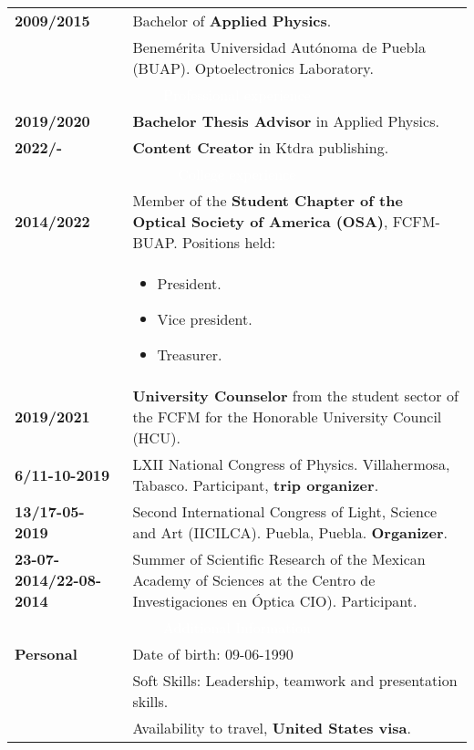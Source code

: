 \documentclass[twoside,letter,openright,10pt]{report}
\begin{document}
\begin{table}[hbt!]
\begin{tabular}{p{40mm}p{140mm}}
\textbf{2009/2015} & Bachelor of \textbf{Applied Physics}.
\\
& Benemérita Universidad Autónoma de Puebla (BUAP). Optoelectronics Laboratory. 
\\
\multicolumn{2}{c}{\cellcolor{black} \textcolor{white}{Professional experience}}
\\
\textbf{2019/2020} & \textbf{Bachelor Thesis Advisor} in Applied Physics.
\\
\textbf{2022/-} & \textbf{Content Creator} in Ktdra publishing.
\\
\multicolumn{2}{c}{\cellcolor{black} \textcolor{white}{College experience}}
\\
\textbf{2014/2022} & Member of the  \textbf{Student Chapter of the Optical Society of America (OSA)}, FCFM-BUAP. Positions held:\\
& \vspace{-2mm}
\begin{itemize}[noitemsep,nolistsep]
\item President.
\item Vice president.
\item Treasurer.
\vspace{-4mm}
\end{itemize}
\\
\textbf{2019/2021} & \textbf{University Counselor} from the student sector of the FCFM for the Honorable University Council (HCU).
\\
\textbf{6/11-10-2019} &LXII National Congress of Physics. Villahermosa, Tabasco. Participant, \textbf{trip organizer}.
\\
\textbf{13/17-05-2019} &Second International Congress of Light, Science and Art (IICILCA). Puebla, Puebla. \textbf{Organizer}.
\\
\textbf{23-07-2014/22-08-2014} & Summer of Scientific Research of the Mexican Academy of Sciences at the Centro de Investigaciones en Óptica CIO). Participant.
\\
\multicolumn{2}{c}{\cellcolor{black} \textcolor{white}{ Additional Information}}
\\
\textbf{Personal} &  Date of birth: 09-06-1990
\\
& Soft Skills: Leadership, teamwork and presentation skills.
\\
& Availability to travel, \textbf{United States visa}.

\end{tabular}
\end{table}
\end{document}
